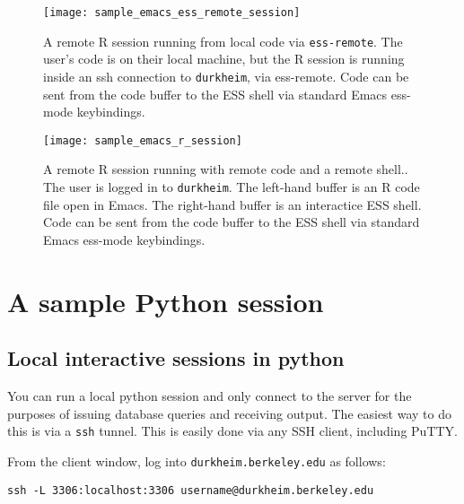 \documentclass[11pt]{article}
\begin{document}
\begin{landscape}
  \begin{figure}[ht]
    \centering
    \texttt{[image: sample\_emacs\_ess\_remote\_session]}
    \caption{A remote R session running from local code via
      \texttt{ess-remote}. The user's code is on their local machine,
      but the R session is running inside an ssh connection to
      \texttt{durkheim}, via ess-remote. Code can be sent from the code buffer to the
      ESS shell via standard Emacs ess-mode keybindings. }
    \label{fig:sample-emacs-r-remote}
  \end{figure}
\end{landscape}


\begin{landscape}
  \begin{figure}[ht]
    \centering
    \texttt{[image: sample\_emacs\_r\_session]}
    \caption{A remote R session running with remote code and a remote
      shell.. The user is logged in to
      \texttt{durkheim}. The left-hand buffer is an R code file
      open in Emacs. The right-hand buffer is an interactice ESS shell. Code can be sent from the code buffer to the
      ESS shell via standard Emacs ess-mode keybindings. }
    \label{fig:sample-emacs-r-remote}
  \end{figure}
\end{landscape}


\section{A sample Python session}

\subsection{Local interactive sessions in python}
\label{sec:local-inter-sess}

You can run a local python session and only connect to the server for
the purposes of issuing database queries and receiving output. The
easiest way to do this is via a \texttt{ssh} tunnel. This is easily
done via any SSH client, including PuTTY. 

From the client window, log into \texttt{durkheim.berkeley.edu} as
follows:

\begin{verbatim}
ssh -L 3306:localhost:3306 username@durkheim.berkeley.edu
\end{verbatim}
\end{document}
